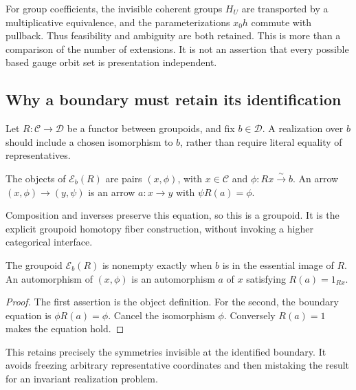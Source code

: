 For group coefficients, the invisible coherent groups \(H_U\) are transported by a multiplicative equivalence, and the parameterizations \(x_0h\) commute with pullback. Thus feasibility and ambiguity are both retained. This is more than a comparison of the number of extensions. It is not an assertion that every possible based gauge orbit set is presentation independent.

\subsection{Why a boundary must retain its identification}
Let \(R:\mathcal C\to\mathcal D\) be a functor between groupoids, and fix \(b\in\mathcal D\). A realization over \(b\) should include a chosen isomorphism to \(b\), rather than require literal equality of representatives.

\begin{KSdefinition}
The objects of \(\mathcal E_b(R)\) are pairs \((x,\phi)\), with \(x\in\mathcal C\) and \(\phi:Rx\xrightarrow{\sim}b\). An arrow \((x,\phi)\to(y,\psi)\) is an arrow \(a:x\to y\) with \(\psi R(a)=\phi\).
\end{KSdefinition}
Composition and inverses preserve this equation, so this is a groupoid. It is the explicit groupoid homotopy fiber construction, without invoking a higher categorical interface.

\begin{KSproposition}\label{KS:KS38}
The groupoid \(\mathcal E_b(R)\) is nonempty exactly when \(b\) is in the essential image of \(R\). An automorphism of \((x,\phi)\) is an automorphism \(a\) of \(x\) satisfying \(R(a)=1_{Rx}\).
\end{KSproposition}
\begin{proof}
The first assertion is the object definition. For the second, the boundary equation is \(\phi R(a)=\phi\). Cancel the isomorphism \(\phi\). Conversely \(R(a)=1\) makes the equation hold.
\end{proof}
This retains precisely the symmetries invisible at the identified boundary. It avoids freezing arbitrary representative coordinates and then mistaking the result for an invariant realization problem.

